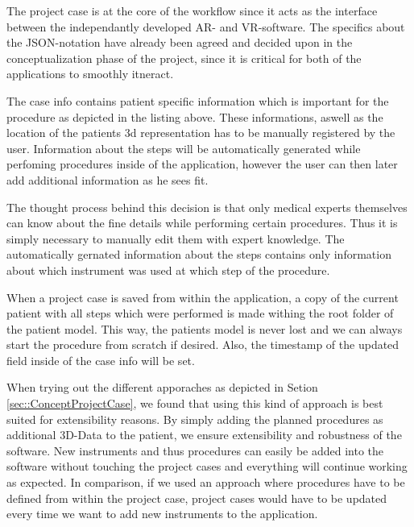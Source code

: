The project case is at the core of the workflow since it acts as the interface between the independantly developed AR- and VR-software.
The specifics about the JSON-notation have already been agreed and decided upon in the conceptualization phase of the project, since it is critical for both of the applications to smoothly itneract. 

The case info contains patient specific information which is important for the procedure as depicted in the listing above.
These informations, aswell as the location of the patients 3d representation has to be manually registered by the user.
Information about the steps will be automatically generated while perfoming procedures inside of the application, however the user can then later add additional information as he sees fit.

The thought process behind this decision is that only medical experts themselves can know about the fine details while performing certain procedures.
Thus it is simply necessary to manually edit them with expert knowledge.
The automatically gernated information about the steps contains only information about which instrument was used at which step of the procedure.

When a project case is saved from within the application, a copy of the current patient with all steps which were performed is made withing the root folder of the patient model.
This way, the patients model is never lost and we can always start the procedure from scratch if desired.
Also, the timestamp of the updated field inside of the case info will be set.

When trying out the different apporaches as depicted in Setion \ref{sec::ConceptProjectCase}, we found that using this kind of approach is best suited for extensibility reasons.
By simply adding the planned procedures as additional 3D-Data to the patient, we ensure extensibility and robustness of the software.
New instruments and thus procedures can easily be added into the software without touching the project cases and everything will continue working as expected.
In comparison, if we used an approach where procedures have to be defined from within the project case, project cases would have to be updated every time we want to add new instruments to the application.